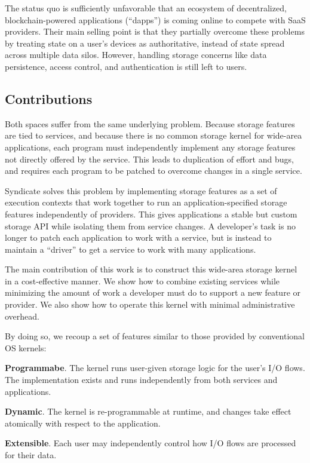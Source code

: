 The status quo is sufficiently unfavorable that an ecosystem of decentralized,
blockchain-powered applications (``dapps'') is coming online to compete with SaaS
providers. Their main selling point is that they partially overcome these
problems by treating state on a user's devices as authoritative, instead of
state spread across multiple data silos. However, handling storage concerns
like data persistence, access control, and authentication is still left to
users.

\subsection{Contributions}

Both spaces suffer from the same underlying problem. Because storage features
are tied to services, and because there is no common storage kernel for
wide-area applications, each program must independently implement any storage
features not directly offered by the service.  This leads to duplication of
effort and bugs, and requires each program to be patched to overcome changes in
a single service.

Syndicate solves this problem by implementing
storage features as a set of execution contexts that work together to run an 
application-specified storage features independently of providers.  This gives
applications a stable but
custom storage API while isolating them from service changes.  A
developer's task is no longer to patch each application to work with a
service, but is instead to maintain a ``driver'' to get a service to
work with many applications.

The main contribution of this work is to construct this
wide-area storage kernel in a cost-effective manner.  We show how to
combine existing services while minimizing the amount of work
a developer must do to support a new feature or provider.  We also show
how to operate this kernel with minimal administrative overhead.

By doing so, we recoup a set of features similar to those provided by
conventional OS kernels:

\textbf{Programmabe}. The kernel runs user-given storage logic for the user's
I/O flows.  The implementation exists and runs independently from both
services and applications.

\textbf{Dynamic}. The kernel is re-programmable at
runtime, and changes take effect atomically with respect to the application.

\textbf{Extensible}.  Each user may independently control how I/O flows are
processed for their data.

